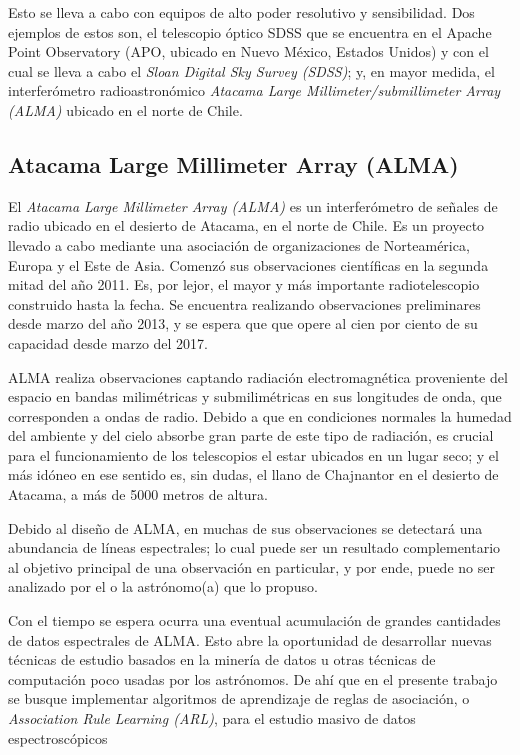 Esto se lleva a cabo con equipos de alto poder resolutivo y sensibilidad. Dos ejemplos de estos son, el telescopio óptico SDSS que se encuentra en el Apache Point Observatory (APO, ubicado en Nuevo México, Estados Unidos) y con el cual se lleva a cabo el \textit{Sloan Digital Sky Survey (SDSS)}; y, en mayor medida, el interferómetro radioastronómico \textit{Atacama Large Millimeter/submillimeter Array (ALMA)} ubicado en el norte de Chile.

\subsection{Atacama Large Millimeter Array (ALMA)}

El \textit{Atacama Large Millimeter Array (ALMA)}\cite{almaobservatory.org}\cite{wootten2009atacama} es un interferómetro de señales de radio ubicado en el desierto de Atacama, en el norte de Chile. Es un proyecto llevado a cabo mediante una asociación de organizaciones de Norteamérica, Europa y el Este de Asia. Comenzó sus observaciones científicas en la segunda mitad del año 2011. Es, por lejor, el mayor y más importante radiotelescopio construido hasta la fecha. Se encuentra realizando observaciones preliminares desde marzo del año 2013, y se espera que que opere al cien por ciento de su capacidad desde marzo del 2017.

ALMA realiza observaciones captando radiación electromagnética proveniente del espacio en bandas milimétricas y submilimétricas en sus longitudes de onda, que corresponden a ondas de radio. Debido a que en condiciones normales la humedad del ambiente y del cielo absorbe gran parte de este tipo de radiación, es crucial para el funcionamiento de los telescopios el estar ubicados en un lugar seco; y el más idóneo en ese sentido es, sin dudas, el llano de Chajnantor en el desierto de Atacama, a más de 5000 metros de altura.

Debido al diseño de ALMA, en muchas de sus observaciones se detectará una abundancia de líneas espectrales; lo cual puede ser un resultado complementario al objetivo principal de una observación en particular, y por ende, puede no ser analizado por el o la astrónomo(a) que lo propuso.

Con el tiempo se espera ocurra una eventual acumulación de grandes cantidades de datos espectrales de ALMA. Esto abre la oportunidad de desarrollar nuevas técnicas de estudio basados en la minería de datos u otras técnicas de computación poco usadas por los astrónomos. De ahí que en el presente trabajo se busque implementar algoritmos de aprendizaje de reglas de asociación, o \textit{Association Rule Learning (ARL)}, para el estudio masivo de datos espectroscópicos

